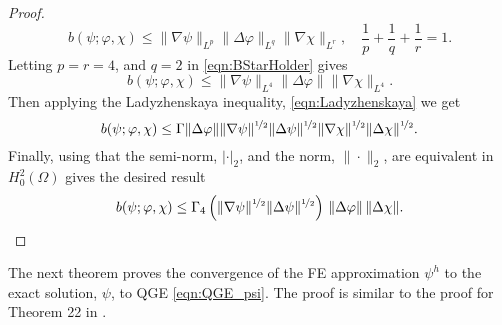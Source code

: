\begin{proof}
\begin{equation}
    b(\psi; \varphi, \chi) \le \|\nabla \psi\|_{L^p} \|\Delta \varphi\|_{L^q}
    \|\nabla \chi\|_{L^r},\quad \frac{1}{p} + \frac{1}{q} + \frac{1}{r} = 1.
    \label{eqn:BStarHolder}
  \end{equation}
  Letting $p = r = 4$, and $q = 2$ in \eqref{eqn:BStarHolder} gives
  \begin{equation*}
    b(\psi; \varphi, \chi) \le \|\nabla \psi\|_{L^4} \|\Delta \varphi\|
    \|\nabla \chi\|_{L^4}.
  \end{equation*}
  Then applying the Ladyzhenskaya inequality, \eqref{eqn:Ladyzhenskaya} we get
  \begin{equation*}
    b(\psi;\varphi,\chi) \le \Gamma \|\Delta \varphi\|
      \|\nabla \psi\|^{\nicefrac{1}{2}} \|\Delta \psi\|^{\nicefrac{1}{2}}
      \|\nabla \chi\|^{\nicefrac{1}{2}} \|\Delta \chi\|^{\nicefrac{1}{2}}.
  \end{equation*}
  Finally, using that the semi-norm, $|\cdot|_2$, and the norm, $\|\cdot\|_2$,
  are equivalent in $H^2_0(\Omega)$ gives the desired result
  \begin{equation*}
    b(\psi;\varphi,\chi) \le \Gamma_4 \left(\|\nabla \psi\|^{\nicefrac{1}{2}}
      \|\Delta \psi\|^{\nicefrac{1}{2}}\right)\,
      \|\Delta \varphi\|\, \|\Delta \chi\|.
  \end{equation*}
\end{proof}
The next theorem proves the convergence of the FE approximation $\psi^h$ to the
exact solution, $\psi$, to QGE \eqref{eqn:QGE_psi}. The proof is similar to
the proof for Theorem 22 in \cite{Layton08}. \\
